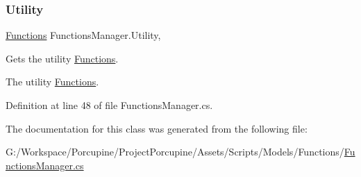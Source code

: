 \subsubsection{\texorpdfstring{Utility}{Utility}}
{\footnotesize\ttfamily \hyperlink{class_functions}{Functions} Functions\+Manager.\+Utility\hspace{0.3cm}{\ttfamily [static]}, {\ttfamily [get]}}



Gets the utility \hyperlink{class_functions}{Functions}. 

The utility \hyperlink{class_functions}{Functions}.

Definition at line 48 of file Functions\+Manager.\+cs.



The documentation for this class was generated from the following file\+:\begin{DoxyCompactItemize}
\item 
G\+:/\+Workspace/\+Porcupine/\+Project\+Porcupine/\+Assets/\+Scripts/\+Models/\+Functions/\hyperlink{_functions_manager_8cs}{Functions\+Manager.\+cs}\end{DoxyCompactItemize}
